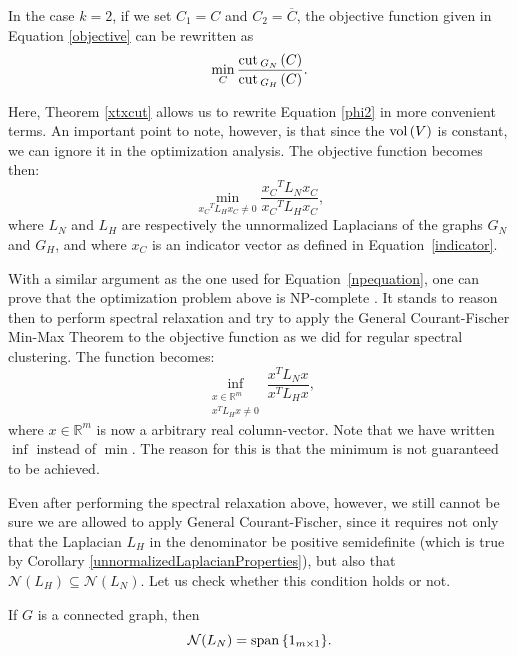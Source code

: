 In the case $k=2$, if we set $C_1 = C$ and $C_2 = \overline C$, the objective function given in Equation \vref{objective} can be rewritten as 
\begin{equation}\label{phi2}
   \min_C \frac{\operatorname{cut\,}_{G_N\,}(C)}{\operatorname{cut\,}_{G_H\,}(C)}.
\end{equation}

Here, Theorem \vref{xtxcut} allows us to rewrite Equation \vref{phi2} in more convenient terms. 
An important point to note, however, is that since the $\operatorname*{vol\,} (V)$ is constant, we can ignore it in the optimization analysis.
The objective function becomes then:
\begin{equation}
   \min_{{x_C}^TL_H {x_C} \ne 0} \frac{{x_C}^TL_N{x_C}}{{x_C}^TL_H{x_C}},
\end{equation}
where $L_N$ and $L_H$ are respectively the unnormalized Laplacians of the graphs $G_N$ and $G_H$, and where $x_C$ is an indicator vector as defined in Equation~\vref{indicator}.

With a similar argument as the one used for Equation~\vref{npequation}, one can prove that the optimization problem above is NP-complete \cite{fastge2}.
It stands to reason then to perform spectral relaxation and try to apply the General Courant-Fischer Min-Max Theorem to the objective function as we did for regular spectral clustering. The function becomes:
\begin{equation}\label{inf}
   \inf_{\substack{x \in \mathbb R^m \\ x^T L_H x \ne 0}} \frac{x^T L_N x}{x^T L_H x},
\end{equation}
where $x \in \mathbb R^{m }$ is now a arbitrary real column-vector.
Note that we have written $\inf$ instead of $\min$.
The reason for this is that the minimum is not guaranteed to be achieved.

Even after performing the spectral relaxation above, however, we still cannot be sure we are allowed to apply General Courant-Fischer, since it requires not only that the Laplacian $L_H$ in the denominator be positive semidefinite (which is true by Corollary \vref{unnormalizedLaplacianProperties}), but also that $\mathcal N (L_H) \subseteq \mathcal N (L_N)$. 
Let us check whether this condition holds or not.


\begin{proposition} \label{spanOfLn}
   If $G$ is a connected graph, then 
   \begin{equation}
      \mathcal N (L_N) = \operatorname{span\,} \{ 1_{m \times 1} \}.
   \end{equation}
\end{proposition}


